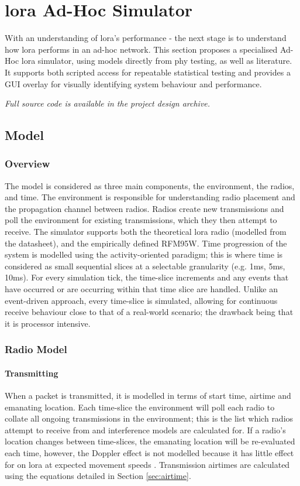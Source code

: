 \chapter{\ac{lora} Ad-Hoc Simulator}
With an understanding of \ac{lora}'s performance - the next stage is to understand how \ac{lora} performs in an ad-hoc network. This section proposes a specialised Ad-Hoc \ac{lora} simulator, using models directly from \ac{phy} testing, as well as literature. It supports both scripted access for repeatable statistical testing and provides a GUI overlay for visually identifying system behaviour and performance. 

\textit{Full source code is available in the project design archive.}

\section{Model}
\subsection{Overview}
The model is considered as three main components, the environment, the radios, and time. The environment is responsible for understanding radio placement and the propagation channel between radios. Radios create new transmissions and poll the environment for existing transmissions, which they then attempt to receive. The simulator supports both the theoretical \ac{lora} radio (modelled from the datasheet), and the empirically defined RFM95W. Time progression of the system is modelled using the activity-oriented paradigm; this is where time is considered as small sequential slices at a selectable granularity (e.g. 1ms, 5ms, 10ms). For every simulation tick, the time-slice increments and any events that have occurred or are occurring within that time slice are handled. Unlike an event-driven approach, every time-slice is simulated, allowing for continuous receive behaviour close to that of a real-world scenario; the drawback being that it is processor intensive.


\subsection{Radio Model}
\subsubsection{Transmitting}
When a packet is transmitted, it is modelled in terms of start time, airtime and emanating location. Each time-slice the environment will poll each radio to collate all ongoing transmissions in the environment; this is the list which radios attempt to receive from and interference models are calculated for. If a radio's location changes between time-slices, the emanating location will be re-evaluated each time, however, the Doppler effect is not modelled because it has little effect for  on \ac{lora} at expected movement speeds \cite{3YP:DOPLER_EFFECT}. Transmission airtimes are calculated using the equations detailed in Section \ref{sec:airtime}.

